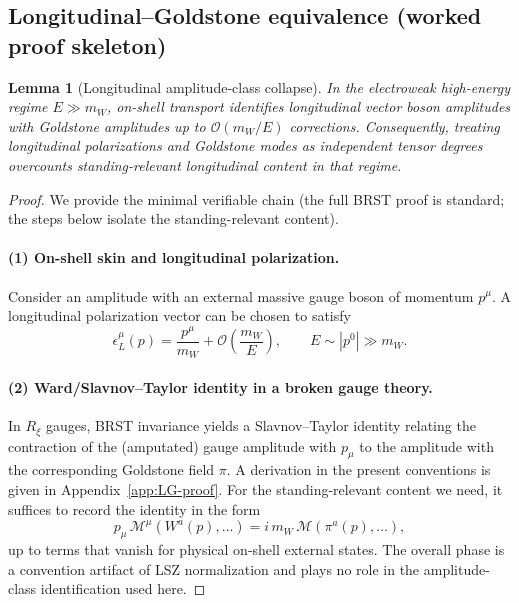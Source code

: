 \documentclass[11pt]{article}
\newtheorem{lemma}[definition]{Lemma}
\theoremstyle{remark}
\newcommand{\cO}{\mathcal{O}}
\begin{document}
\subsection{Longitudinal--Goldstone equivalence (worked proof skeleton)}

\begin{lemma}[Longitudinal amplitude-class collapse]\label{lem:LG}
In the electroweak high-energy regime $E\gg m_W$, on-shell transport identifies longitudinal vector
boson amplitudes with Goldstone amplitudes up to $\cO(m_W/E)$ corrections. Consequently, treating
longitudinal polarizations and Goldstone modes as independent tensor degrees overcounts
standing-relevant longitudinal content in that regime.
\end{lemma}

\begin{proof}
We provide the minimal verifiable chain (the full BRST proof is standard; the steps below isolate the
standing-relevant content).

\paragraph{(1) On-shell skin and longitudinal polarization.}
Consider an amplitude with an external massive gauge boson of momentum $p^\mu$.
A longitudinal polarization vector can be chosen to satisfy
\begin{equation}\label{eq:epsL}
\epsilon_L^\mu(p)=\frac{p^\mu}{m_W}+\cO\!\left(\frac{m_W}{E}\right),
\qquad E\sim |p^0|\gg m_W.
\end{equation}

\paragraph{(2) Ward/Slavnov--Taylor identity in a broken gauge theory.}
In $R_\xi$ gauges, BRST invariance yields a Slavnov--Taylor identity relating the contraction of the
(amputated) gauge amplitude with $p_\mu$ to the amplitude with the corresponding Goldstone field $\pi$.
A derivation in the present conventions is given in Appendix~\ref{app:LG-proof}.
For the standing-relevant content we need, it suffices to record the identity in the form
\begin{equation}\label{eq:ward}
p_\mu\,\mathcal{M}^\mu(W^a(p),\dots)= i\,m_W\,\mathcal{M}(\pi^a(p),\dots),
\end{equation}
up to terms that vanish for physical on-shell external states. The overall phase is a convention
artifact of LSZ normalization and plays no role in the amplitude-class identification used here.

\end{proof}
\end{document}
